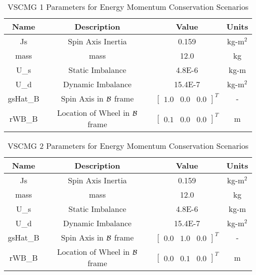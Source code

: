\begin{table}[htbp]
	\caption{VSCMG 1 Parameters for Energy Momentum Conservation Scenarios}
	\label{tab:rw1}
	\centering \fontsize{10}{10}\selectfont
	\begin{tabular}{ c | c | c | c } %
		\hline
		\textbf{Name}  & \textbf{Description}  & \textbf{Value} & \textbf{Units} \\
		\hline
		Js  & Spin Axis Inertia & 0.159 & kg-m$^2$ \\
		mass & mass & 12.0 & kg \\
		U\_s & Static Imbalance & 4.8E-6 & kg-m \\
		U\_d & Dynamic Imbalance & 15.4E-7 & kg-m$^2$ \\
		gsHat\_B & Spin Axis in $\cal{B}$ frame & $\begin{bmatrix}
		1.0 & 0.0 & 0.0 \end{bmatrix}^T$ & - \\
		rWB\_B & Location of Wheel in $\cal{B}$ frame & $\begin{bmatrix}
		0.1 & 0.0 & 0.0 \end{bmatrix}^T$ & m \\
		\hline
	\end{tabular}
\end{table}

\begin{table}[htbp]
	\caption{VSCMG 2 Parameters for Energy Momentum Conservation Scenarios}
	\label{tab:rw2}
	\centering \fontsize{10}{10}\selectfont
	\begin{tabular}{ c | c | c | c } %
		\hline
		\textbf{Name}  & \textbf{Description}  & \textbf{Value} & \textbf{Units} \\
		\hline
		Js  & Spin Axis Inertia & 0.159 & kg-m$^2$ \\
		mass & mass & 12.0 & kg \\
		U\_s & Static Imbalance & 4.8E-6 & kg-m \\
		U\_d & Dynamic Imbalance & 15.4E-7 & kg-m$^2$ \\
		gsHat\_B & Spin Axis in $\cal{B}$ frame & $\begin{bmatrix}
		0.0 & 1.0 & 0.0 \end{bmatrix}^T$ & - \\
		rWB\_B & Location of Wheel in $\cal{B}$ frame & $\begin{bmatrix}
		0.0 & 0.1 & 0.0 \end{bmatrix}^T$ & m \\
		\hline
	\end{tabular}
\end{table}

